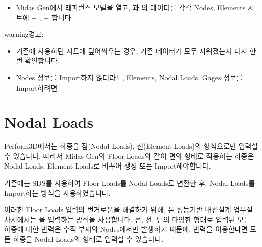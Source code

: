 \documentclass[a4paper,11pt,korean,openany,oneside]{sphinxmanual}
\begin{document}
\begin{sphinxShadowBox}
\begin{itemize}
\item {} 
\sphinxAtStartPar
Midas Gen에서 레퍼런스 모델을 열고, 과 의
데이터를 각각 Nodes, Elements 시트에 + , + 합니다.

\end{itemize}
\end{sphinxShadowBox}

\begin{sphinxadmonition}{warning}{경고:}\begin{itemize}
\item {} 
\sphinxAtStartPar
기존에 사용하던 시트에 덮어씌우는 경우, 기존 데이터가 모두 지워졌는지 다시 한 번 확인합니다.

\item {} 
\sphinxAtStartPar
Nodes 정보를 Import하지 않더라도, Elements, Nodal Loads, Gages 정보를 Import하려면 

\end{itemize}
\end{sphinxadmonition}

\sphinxstepscope


\section{Nodal Loads}
\label{\detokenize{2_nodal_loads:nodal-loads}}\label{\detokenize{2_nodal_loads::doc}}
\sphinxAtStartPar
Perform\sphinxhyphen{}3D에서는 하중을 점(Nodal Loads), 선(Element Loads)의 형식으로만 입력할 수 있습니다.
따라서 Midas Gen의 Floor Loads와 같이 면의 형태로 작용하는 하중은 Nodal Loads, Element Loads로 바꾸어 생성 또는 Import해야합니다.

\sphinxAtStartPar
{}기존에는 SDS를 사용하여 Floor Loads를 Nodal Loads로 변환한 후, Nodal Loads를 Import하는 방식을 사용하였습니다.

\sphinxAtStartPar
이러한 Floor Loads 입력의 번거로움을 해결하기 위해, 본 성능기반 내진설계 업무절차서에서는 을 입력하는 방식을 사용합니다.
점, 선, 면의 다양한 형태로 입력된 모든 하중에 대한 반력은 수직 부재의 Nodes에서만 발생하기 때문에,
반력을 이용한다면 모든 하중을 Nodal Loads의 형태로 입력할 수 있습니다.
\end{document}
